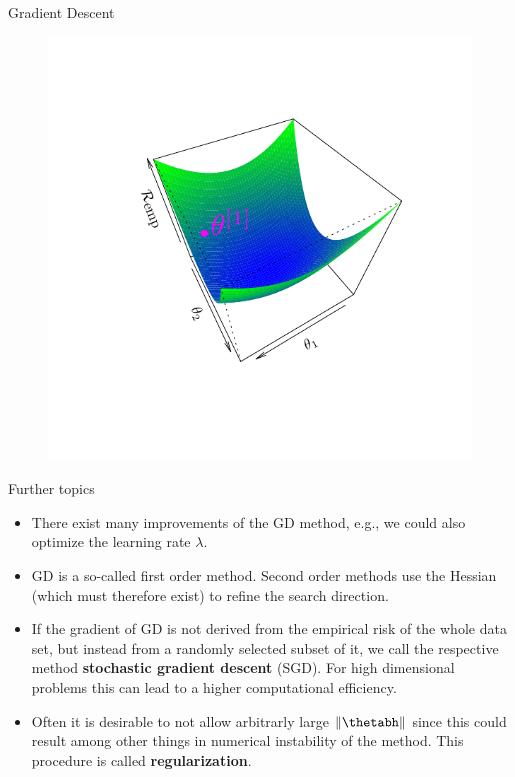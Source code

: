 \documentclass[11pt,compress,t,notes=noshow, xcolor=table]{beamer}
\begin{document}
\begin{vbframe}{Gradient Descent}
\begin{figure}[!htb]
\endminipage\hfill
{}%
  \includegraphics[trim=2cm 2cm 2cm 2cm, width=\linewidth]{figure/grad_desc3}
\endminipage
\end{figure}

\end{vbframe}
\begin{vbframe}{Further topics}
\begin{itemize}
\item There exist many improvements of the GD method, e.g., we could also optimize the learning rate $\lambda$.
\item GD is a so-called first order method. Second order methods use the Hessian (which must therefore exist) to refine the search direction.
\item If the gradient of GD is not derived from the empirical risk of the whole data set, but instead from a randomly selected subset of it, we call the respective method \textbf{stochastic gradient descent} (SGD). For high dimensional problems this can lead to a higher computational efficiency.
\item Often it is desirable to not allow arbitrarly large $\Vert \thetabh \Vert$ since this could result among other things in numerical instability of the method. This procedure is called \textbf{regularization}.
\end{itemize}
\end{vbframe}

\endlecture
\end{document}
